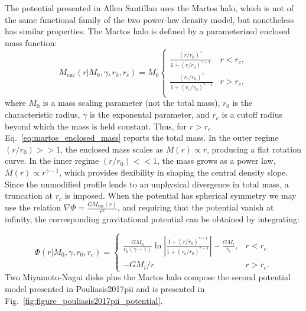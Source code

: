         The potential presented in Allen Santillan uses the Martos halo, which is not of the same functional family of the two power-law density model, but nonetheless has similar properties. The Martos halo is defined by a parameterized enclosed mass function:
        \begin{equation} 
            M_{\mathrm{enc}}(r|M_0,\gamma,r_0,r_c) = M_0
            \begin{cases}
             \frac{\left(r/r_0\right)^\gamma}{1 + \left(r/r_0\right)^{\gamma - 1}} & r<r_c,\\
             \frac{\left(r_c/r_0\right)^\gamma}{1 + \left(r_c/r_0\right)^{\gamma - 1}} & r> r_c,\\
            \end{cases} 
            \label{eq:martos_enclosed_mass}
        \end{equation}
        where $M_0$ is a mass scaling parameter (not the total mass), $r_0$ is the characteristic radius, $\gamma$ is the exponental parameter, and $r_c$ is a cutoff radius beyond which the mass is held constant. Thus, for $r > r_c$ Eq.~\ref{eq:martos_enclosed_mass} reports the total mass. In the outer regime $(r/r_0) >> 1$, the enclosed mass scales as $M(r) \propto r$, producing a flat rotation curve. In the inner regime $(r/r_0) << 1$, the mass grows as a power law, $M(r) \propto r^{\gamma - 1}$, which provides flexibility in shaping the central density slope. Since the unmodified profile leads to an unphysical divergence in total mass, a truncation at $r_c$ is imposed. When the potential has spherical symmetry we may use the relation $\nabla \Phi = \frac{G M_{\mathrm{enc}}(r)}{r^2}$, and requiring that the potential vanish at infinity, the corresponding gravitational potential can be obtained by integrating:


        \begin{equation}
            \Phi(r|M_0,\gamma,r_0,r_c) = 
            \begin{cases}
                \frac{GM_0}{r_0\left(\gamma-1\right)}\ln\left|\frac{1+(r/r_0)^{\gamma-1}}{1+(r_c/r_0)^{\gamma-1}}\right| -\frac{GM_t}{r_c}, & r<r_c\\
                -GM_t/r & r>r_c.
            \end{cases}
        \end{equation}
        Two Miyamoto-Nagai disks plus the Martos halo compose the second potential model presented in Pouliasis2017pii and is presented in Fig.~\ref{fig:figure_pouliasis2017pii_potential}.
        
